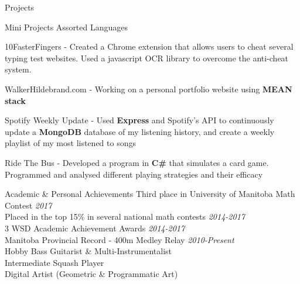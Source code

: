 \documentclass{resume} %
\newcommand{\award}[2]{#1 \hfill {\em #2}}
\begin{document}
\begin{rSection}{Projects}
    \vspace{1em}

    \begin{sideproject}
        {Mini Projects}
        {Assorted Languages}
        {}
        {
            \item 10FasterFingers - Created a Chrome extension that allows users to cheat several typing test websites. Used a javascript OCR library to overcome the anti-cheat system.
            \item WalkerHildebrand.com - Working on a personal portfolio website using \textbf{MEAN stack}
            \item Spotify Weekly Update - Used \textbf{Express} and Spotify's API to continuously update a \textbf{MongoDB} database of my listening history, and create a weekly playlist of my most listened to songs
            \item Ride The Bus - Developed a program in \textbf{C\#} that simulates a card game. Programmed and analysed different playing strategies and their efficacy
        }
    \end{sideproject}



\end{rSection}


\begin{rSection}{Academic \& Personal Achievements}
    \award{Third place in University of Manitoba Math Contest}{2017} \\
    \award{Placed in the top 15\% in several national math contests}{2014-2017} \\
    \award{3 WSD Academic Achievement Awards}{2014-2017}\\
    \award{Manitoba Provincial Record - 400m Medley Relay}{2010-Present}\\
    \award{Hobby Bass Guitarist \& Multi-Instrumentalist}{ }\\
    \award{Intermediate Squash Player}{}\\
    \award{Digital Artist (Geometric \& Programmatic Art)}{}\\
\end{rSection}


    
    
\end{document}
